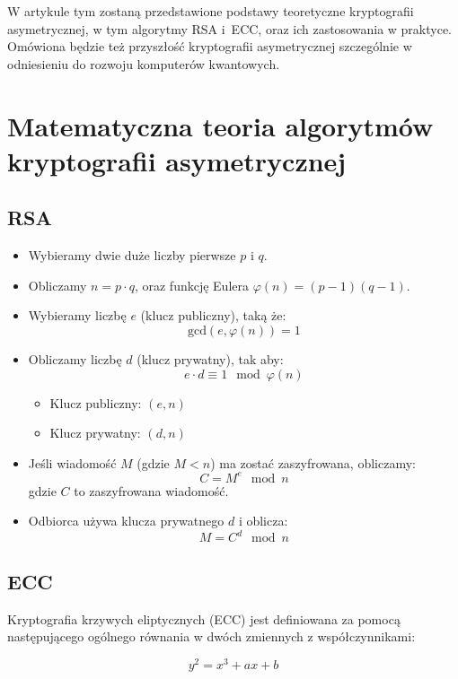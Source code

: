 \documentclass[conference]{IEEEtran}
\begin{document}
W artykule tym zostaną przedstawione podstawy teoretyczne kryptografii asymetrycznej, w tym algorytmy RSA i~ECC, oraz ich zastosowania w praktyce. Omówiona będzie też przyszłość kryptografii asymetrycznej szczególnie w odniesieniu do rozwoju komputerów kwantowych.


\section{Matematyczna teoria algorytmów kryptografii asymetrycznej}

\subsection{RSA}
\begin{itemize}
    \item Wybieramy dwie duże liczby pierwsze \( p \) i \( q \).
    \item Obliczamy \( n = p \cdot q \), oraz funkcję Eulera \( \varphi(n) = (p - 1)(q - 1) \).
    \item Wybieramy liczbę \( e \) (klucz publiczny), taką że:
    \[
    \text{gcd}(e, \varphi(n)) = 1
    \]
    \item Obliczamy liczbę \( d \) (klucz prywatny), tak aby:
    \[
    e \cdot d \equiv 1 \mod \varphi(n)
    \]
      \begin{itemize}
        \item Klucz publiczny: \( (e, n) \)
        \item Klucz prywatny: \( (d, n) \)

    \end{itemize}


     \item  Jeśli wiadomość \( M \) (gdzie \( M < n \)) ma zostać zaszyfrowana, obliczamy:
    \[
    C = M^e \mod n
    \]
    gdzie \( C \) to zaszyfrowana wiadomość.

     \item  Odbiorca używa klucza prywatnego \( d \) i oblicza:
    \[
    M = C^d \mod n
    \]
    \end{itemize}
\subsection{ECC}

Kryptografia krzywych eliptycznych (ECC) jest definiowana za pomocą następującego ogólnego równania w dwóch zmiennych z współczynnikami:

\[
    y^2 = x^3 + ax + b
\]
\end{document}
